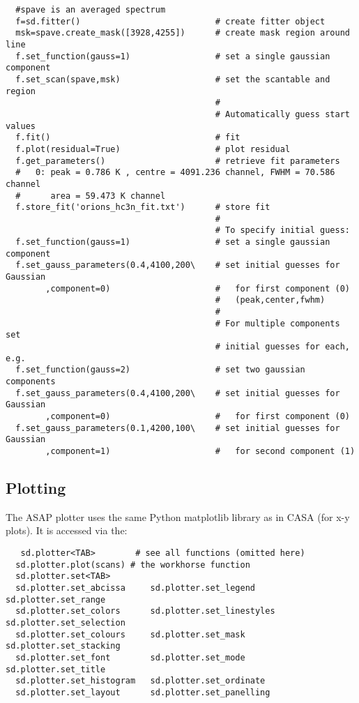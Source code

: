 \small
\begin{verbatim}
  #spave is an averaged spectrum
  f=sd.fitter()                           # create fitter object
  msk=spave.create_mask([3928,4255])      # create mask region around line
  f.set_function(gauss=1)                 # set a single gaussian component
  f.set_scan(spave,msk)                   # set the scantable and region
                                          # 
                                          # Automatically guess start values
  f.fit()                                 # fit 
  f.plot(residual=True)                   # plot residual
  f.get_parameters()                      # retrieve fit parameters
  #   0: peak = 0.786 K , centre = 4091.236 channel, FWHM = 70.586 channel
  #      area = 59.473 K channel
  f.store_fit('orions_hc3n_fit.txt')      # store fit
                                          #
                                          # To specify initial guess:
  f.set_function(gauss=1)                 # set a single gaussian component
  f.set_gauss_parameters(0.4,4100,200\    # set initial guesses for Gaussian
        ,component=0)                     #   for first component (0)
                                          #   (peak,center,fwhm)
                                          #
                                          # For multiple components set
                                          # initial guesses for each, e.g.
  f.set_function(gauss=2)                 # set two gaussian components
  f.set_gauss_parameters(0.4,4100,200\    # set initial guesses for Gaussian
        ,component=0)                     #   for first component (0)
  f.set_gauss_parameters(0.1,4200,100\    # set initial guesses for Gaussian
        ,component=1)                     #   for second component (1)

\end{verbatim}
\normalsize

\subsection{Plotting}
\label{subsection:sd.asap.plotting}

The ASAP plotter uses the same Python matplotlib library as in CASA
(for x-y plots). It is accessed via the: 

\small
\begin{verbatim}
   sd.plotter<TAB>        # see all functions (omitted here)
  sd.plotter.plot(scans) # the workhorse function
  sd.plotter.set<TAB>
  sd.plotter.set_abcissa     sd.plotter.set_legend      sd.plotter.set_range
  sd.plotter.set_colors      sd.plotter.set_linestyles  sd.plotter.set_selection
  sd.plotter.set_colours     sd.plotter.set_mask        sd.plotter.set_stacking
  sd.plotter.set_font        sd.plotter.set_mode        sd.plotter.set_title
  sd.plotter.set_histogram   sd.plotter.set_ordinate    
  sd.plotter.set_layout      sd.plotter.set_panelling   
\end{verbatim}
\normalsize


